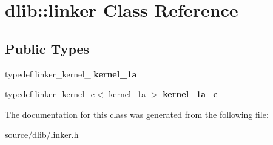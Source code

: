 \hypertarget{classdlib_1_1linker}{
\section{dlib::linker Class Reference}
\label{classdlib_1_1linker}
}
\subsection*{Public Types}
\begin{DoxyCompactItemize}
\item 
\hypertarget{classdlib_1_1linker_a17f6056c713df703495ebe48865ad003}{
typedef linker\_\-kernel\_ {\bfseries kernel\_\-1a}}
\label{classdlib_1_1linker_a17f6056c713df703495ebe48865ad003}

\item 
\hypertarget{classdlib_1_1linker_a5c2c8f001f8a1c5f78d05122e34b9245}{
typedef linker\_\-kernel\_\-c$<$ kernel\_\-1a $>$ {\bfseries kernel\_\-1a\_\-c}}
\label{classdlib_1_1linker_a5c2c8f001f8a1c5f78d05122e34b9245}

\end{DoxyCompactItemize}


The documentation for this class was generated from the following file:\begin{DoxyCompactItemize}
\item 
source/dlib/linker.h\end{DoxyCompactItemize}
